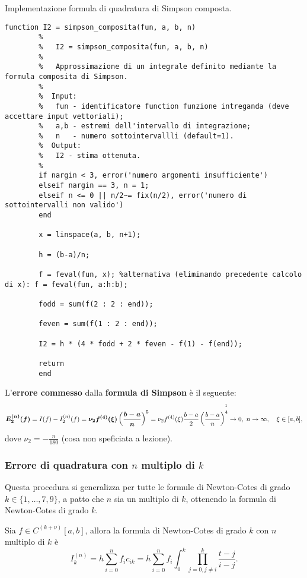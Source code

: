\begin{algorithm}
	\caption{Implementazione formula di quadratura di Simpson composta.}\label{alg:simpson_composita}
	\begin{lstlisting}[style=Matlab-editor]
		function I2 = simpson_composita(fun, a, b, n)
		%   
		%   I2 = simpson_composita(fun, a, b, n)
		%
		%   Approssimazione di un integrale definito mediante la formula composita di Simpson.
		%
		%  Input:
		%   fun - identificatore function funzione intreganda (deve accettare input vettoriali);
		%   a,b - estremi dell'intervallo di integrazione;
		%   n   - numero sottointervallli (default=1).
		%  Output:
		%   I2 - stima ottenuta.
		%
		if nargin < 3, error('numero argomenti insufficiente')
		elseif nargin == 3, n = 1;
		elseif n <= 0 || n/2~= fix(n/2), error('numero di sottointervalli non valido')
		end
		
		x = linspace(a, b, n+1);
		
		h = (b-a)/n;
		
		f = feval(fun, x); %alternativa (eliminando precedente calcolo di x): f = feval(fun, a:h:b);
		
		fodd = sum(f(2 : 2 : end));
		
		feven = sum(f(1 : 2 : end));
		
		I2 = h * (4 * fodd + 2 * feven - f(1) - f(end));
		
		return
		end
	\end{lstlisting}
\end{algorithm}

\begin{definition}
    L'\textbf{errore commesso} dalla \textbf{formula di Simpson} è il seguente:
    \begin{equation}\label{eq:errFormSimpComp}
        \boldsymbol{E_2^{(n)}(f)}=I(f)-I_2^{(n)}(f)=\boldsymbol{\nu_2 f^{(4)}(\xi)\left(\frac{b-a}{n}\right)^5} = \nu_2f^{(4)}(\xi)\frac{b-a}{2}\left(\frac{b-a}{n}\right)^{\overset{\footnotemark}{4}}\rightarrow 0,\; n\rightarrow\infty,\quad \xi\in[a,b],
    \end{equation}
    dove $\nu_2 = -\frac{n}{180}$ (cosa non speficiata a lezione).
\end{definition}

\subsubsection{Errore di quadratura con \texorpdfstring{$n$}{n} multiplo di \texorpdfstring{$k$}{k}}
Questa procedura si generalizza per tutte le formule di Newton-Cotes di grado $k\in\{1,\hdots, 7, 9\}$, a patto che $n$ sia un multiplo di $k$, ottenendo la formula di Newton-Cotes di grado $k$.
\begin{definition}
	Sia $f\in C^{(k+\nu)}[a,b]$, allora la formula di Newton-Cotes di grado $k$ con $n$ multiplo di $k$ è
	\begin{equation*}
    	I_k^{(n)}=h\sum_{i=0}^nf_ic_{ik}=h\sum_{i=0}^nf_i\int_0^k\prod_{j=0, j\neq i}^k\frac{t-j}{i-j}.
	\end{equation*}
\end{definition}

